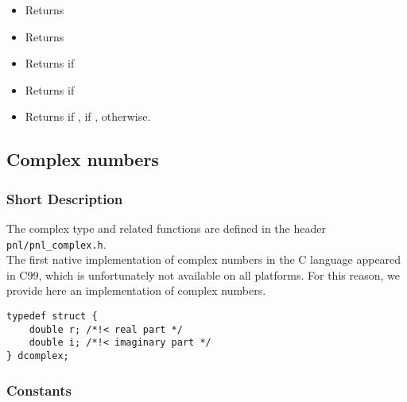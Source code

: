 \begin{itemize}
\item {}
  \sshortdescribe Returns  

\item {}
  \sshortdescribe Returns  

\item {}
  \sshortdescribe Returns  if 

\item {}
  \sshortdescribe Returns  if 

\item {}
  \sshortdescribe Returns  if ,  if ,
   otherwise.
\end{itemize}



\subsection{Complex numbers}
\subsubsection{Short Description}

The complex type and related functions are defined in the header
\verb!pnl/pnl_complex.h!.\\

The first native implementation of complex numbers in the C language appeared in
C99, which is unfortunately not available on all platforms. For this reason, we
provide here an implementation of complex numbers.

\begin{verbatim}
typedef struct {
    double r; /*!< real part */
    double i; /*!< imaginary part */
} dcomplex;
\end{verbatim}


\subsubsection{Constants}

\begin{describeconst}
\end{describeconst}

